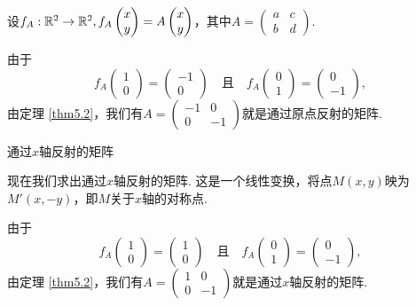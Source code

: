 设$f_A:\mathbb R^2\to\mathbb R^2,f_A\begin{pmatrix}
  x \\
  y
\end{pmatrix}=A\begin{pmatrix}
  x \\
  y
\end{pmatrix}$，其中$A=\begin{pmatrix}
  a & c \\
  b & d
\end{pmatrix}$.

由于
\[
  f_A\begin{pmatrix}
    1 \\
    0
  \end{pmatrix} =
  \begin{pmatrix}
    -1 \\
    0
  \end{pmatrix}\quad \text{且} \quad
  f_A\begin{pmatrix}
    0 \\
    1
  \end{pmatrix} =
  \begin{pmatrix}
    0 \\
    -1
  \end{pmatrix},
\]
由定理 \ref{thm5.2}，我们有$A=\begin{pmatrix}
  -1 & 0 \\
  0 & -1
\end{pmatrix}$就是通过原点反射的矩阵.

{\noindent \kaishu 通过$x$轴反射的矩阵}

现在我们求出通过$x$轴反射的矩阵. 这是一个线性变换，将点$M(x,y)$映为$M'(x,-y)$，即$M$关于$x$轴的对称点.

由于
\[
  f_A\begin{pmatrix}
    1 \\
    0
  \end{pmatrix} =
  \begin{pmatrix}
    1 \\
    0
  \end{pmatrix}\quad \text{且} \quad
  f_A\begin{pmatrix}
    0 \\
    1
  \end{pmatrix} =
  \begin{pmatrix}
    0 \\
    -1
  \end{pmatrix},
\]
由定理 \ref{thm5.2}，我们有$A=\begin{pmatrix}
  1 & 0 \\
  0 & -1
\end{pmatrix}$就是通过$x$轴反射的矩阵.

